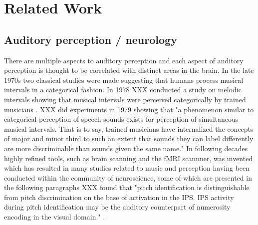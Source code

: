 \chapter{Related Work}

\section{Auditory perception / neurology}

There are multiple aspects to auditory perception and each aspect of auditory perception is thought to be correlated with distinct areas in the brain.
In the late 1970s two classical studies were made suggesting that humans process musical intervals in a categorical fashion. In 1978 XXX conducted a study on melodic intervals showing that musical intervals were perceived categorically by trained musicians \cite{burns1978categorical}. XXX did experiments in 1979 showing that "a phenomenon similar to categorical perception of speech sounds exists for perception of simultaneous musical intervals. That is to say, trained musicians have internalized the concepts of major and minor third to such an extent that sounds they can label differently are more discriminable than sounds given the same name." \cite{zatorre1979identification}
In following decades highly refined tools, such as brain scanning and the fMRI scannner, was invented which has resulted in many studies related to music and perception having been conducted within the community of neuroscience, some of which are presented in the following paragraphs
XXX found that "pitch identification is distinguishable from pitch discrimination on the base of activation in the IPS. IPS activity during pitch identification may be the auditory counterpart of numerosity encoding in the visual domain." \cite{schwenzer2011numeric}.


